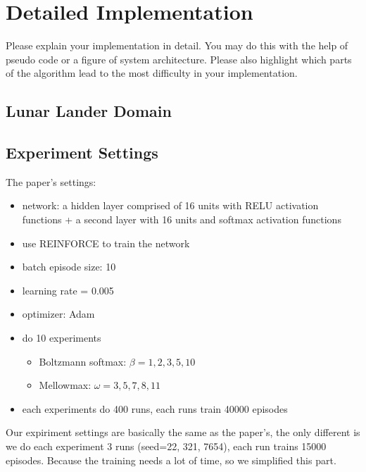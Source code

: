 \section{Detailed Implementation}
\label{section:implementation}
Please explain your implementation in detail. You may do this with the help of pseudo code or a figure of system architecture. Please also highlight which parts of the algorithm lead to the most difficulty in your implementation.
\subsection{Lunar Lander Domain}
\subsection*{Experiment Settings}
The paper's settings:
\begin{itemize}
    \item network: a hidden layer comprised of 16 units with RELU activation functions + a second layer with 16 units and softmax activation functions
    \item use REINFORCE to train the network
    \item batch episode size: 10
    \item learning rate = 0.005
    \item optimizer: Adam
    \item do 10 experiments
    \begin{itemize}
        \item Boltzmann softmax: $\beta=1,2,3,5,10$
        \item Mellowmax: $\omega=3,5,7,8,11$
    \end{itemize}
    \item each experiments do 400 runs, each runs train 40000 episodes
\end{itemize}
Our expiriment settings are basically the same as the paper's, the only different is we do each experiment 3 runs (seed=22, 321, 7654), each run trains 15000 episodes.
Because the training needs a lot of time, so we simplified this part.
